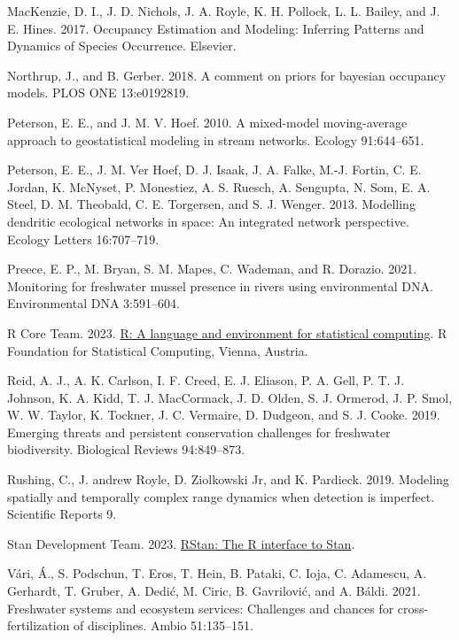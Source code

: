 \documentclass[
  11pt,
  a4paper,
]{article}
\newlength{\cslhangindent}
\newenvironment{CSLReferences}[2] %
 {\begin{list}{}{%
  \setlength{\itemindent}{0pt}
  \setlength{\leftmargin}{0pt}
  \setlength{\parsep}{0pt}
  \ifodd #1
   \setlength{\leftmargin}{\cslhangindent}
   \setlength{\itemindent}{-1\cslhangindent}
  \fi
  \setlength{\itemsep}{#2\baselineskip}}}
 {\end{list}}
\begin{document}
\begin{CSLReferences}{1}{0}
MacKenzie, D. I., J. D. Nichols, J. A. Royle, K. H. Pollock, L. L. Bailey, and J. E. Hines. 2017. Occupancy {Estimation} and {Modeling}: {Inferring Patterns} and {Dynamics} of {Species Occurrence}. {Elsevier}.

Northrup, J., and B. Gerber. 2018. A comment on priors for bayesian occupancy models. PLOS ONE 13:e0192819.

Peterson, E. E., and J. M. V. Hoef. 2010. A mixed-model moving-average approach to geostatistical modeling in stream networks. Ecology 91:644--651.

Peterson, E. E., J. M. Ver Hoef, D. J. Isaak, J. A. Falke, M.-J. Fortin, C. E. Jordan, K. McNyset, P. Monestiez, A. S. Ruesch, A. Sengupta, N. Som, E. A. Steel, D. M. Theobald, C. E. Torgersen, and S. J. Wenger. 2013. Modelling dendritic ecological networks in space: An integrated network perspective. Ecology Letters 16:707--719.

Preece, E. P., M. Bryan, S. M. Mapes, C. Wademan, and R. Dorazio. 2021. Monitoring for freshwater mussel presence in rivers using environmental DNA. Environmental DNA 3:591--604.

R Core Team. 2023. \href{https://www.R-project.org/}{R: A language and environment for statistical computing}. R Foundation for Statistical Computing, Vienna, Austria.

Reid, A. J., A. K. Carlson, I. F. Creed, E. J. Eliason, P. A. Gell, P. T. J. Johnson, K. A. Kidd, T. J. MacCormack, J. D. Olden, S. J. Ormerod, J. P. Smol, W. W. Taylor, K. Tockner, J. C. Vermaire, D. Dudgeon, and S. J. Cooke. 2019. Emerging threats and persistent conservation challenges for freshwater biodiversity. Biological Reviews 94:849--873.

Rushing, C., J. andrew Royle, D. Ziolkowski Jr, and K. Pardieck. 2019. Modeling spatially and temporally complex range dynamics when detection is imperfect. Scientific Reports 9.

Stan Development Team. 2023. \href{https://mc-stan.org/}{{RStan}: The {R} interface to {Stan}}.

Vári, Á., S. Podschun, T. Eros, T. Hein, B. Pataki, C. Ioja, C. Adamescu, A. Gerhardt, T. Gruber, A. Dedić, M. Ciric, B. Gavrilović, and A. Báldi. 2021. Freshwater systems and ecosystem services: Challenges and chances for cross-fertilization of disciplines. Ambio 51:135--151.


\end{CSLReferences}
\end{document}
